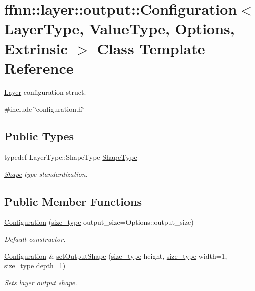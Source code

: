 \hypertarget{classffnn_1_1layer_1_1output_1_1_configuration}{\section{ffnn\-:\-:layer\-:\-:output\-:\-:Configuration$<$ Layer\-Type, Value\-Type, Options, Extrinsic $>$ Class Template Reference}
\label{classffnn_1_1layer_1_1output_1_1_configuration}
}


\hyperlink{classffnn_1_1layer_1_1_layer}{Layer} configuration struct.  




{\ttfamily \#include \char`\"{}configuration.\-h\char`\"{}}

\subsection*{Public Types}
\begin{DoxyCompactItemize}
\item 
typedef Layer\-Type\-::\-Shape\-Type \hyperlink{classffnn_1_1layer_1_1output_1_1_configuration_a94205bb6347c6cf89c33b2e4f8b467ea}{Shape\-Type}
\begin{DoxyCompactList}\small\item\em \hyperlink{structffnn_1_1layer_1_1_shape}{Shape} type standardization. \end{DoxyCompactList}\end{DoxyCompactItemize}
\subsection*{Public Member Functions}
\begin{DoxyCompactItemize}
\item 
\hyperlink{classffnn_1_1layer_1_1output_1_1_configuration_a5c3d360bba0eb7d7e1e3dc1ca73d8ee8}{Configuration} (\hyperlink{namespaceffnn_a63b90a2fd70eb76684eac482a51633e5}{size\-\_\-type} output\-\_\-size=Options\-::output\-\_\-size)
\begin{DoxyCompactList}\small\item\em Default constructor. \end{DoxyCompactList}\item 
\hyperlink{classffnn_1_1layer_1_1output_1_1_configuration}{Configuration} \& \hyperlink{classffnn_1_1layer_1_1output_1_1_configuration_a566958f40b4f5e0b2235581f1d891fba}{set\-Output\-Shape} (\hyperlink{namespaceffnn_a63b90a2fd70eb76684eac482a51633e5}{size\-\_\-type} height, \hyperlink{namespaceffnn_a63b90a2fd70eb76684eac482a51633e5}{size\-\_\-type} width=1, \hyperlink{namespaceffnn_a63b90a2fd70eb76684eac482a51633e5}{size\-\_\-type} depth=1)
\begin{DoxyCompactList}\small\item\em Sets layer output shape. \end{DoxyCompactList}\end{DoxyCompactItemize}
